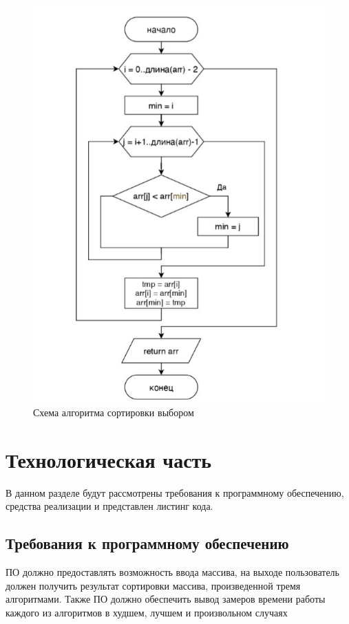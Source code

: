 \documentclass[a4paper,12pt]{article}
\begin{document}
	\begin{figure}[H]
		\centering
		\includegraphics{min.png}
		\captionsetup{justification=centering}
		\caption{Схема алгоритма сортировки выбором}
		\label{Рис 3}
	\end{figure}
	\newpage
	\section{Технологическая часть}
	\hfill
	
	В данном разделе будут рассмотрены требования к программному обеспечению, средства реализации и представлен листинг кода.
	\subsection{Требования к программному обеспечению}
	\hfill
	
	ПО должно предоставлять возможность ввода массива, на выходе пользователь должен получить результат сортировки массива, произведенной тремя алгоритмами. Также ПО должно обеспечить вывод замеров времени работы каждого из алгоритмов в худшем, лучшем и произвольном случаях
	
\end{document}
